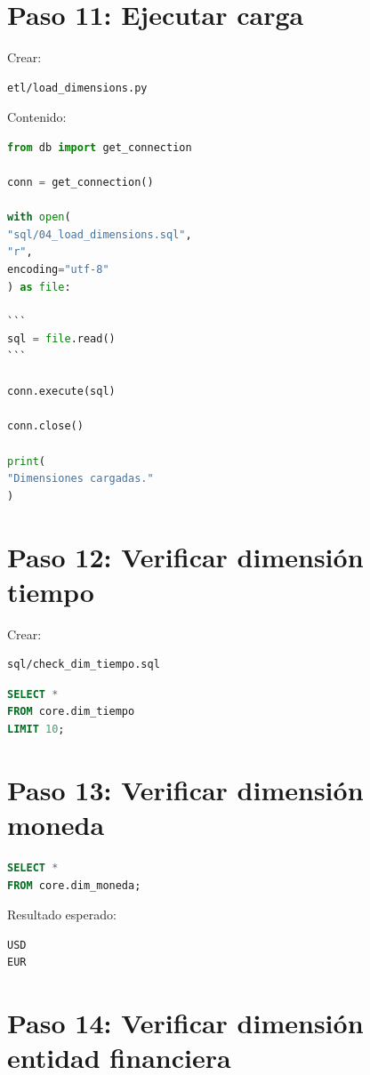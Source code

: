\section{Paso 11: Ejecutar carga}

Crear:

\begin{verbatim}
etl/load_dimensions.py
\end{verbatim}

Contenido:

\begin{lstlisting}[language=Python]
from db import get_connection

conn = get_connection()

with open(
"sql/04_load_dimensions.sql",
"r",
encoding="utf-8"
) as file:

```
sql = file.read()
```

conn.execute(sql)

conn.close()

print(
"Dimensiones cargadas."
)
\end{lstlisting}

\section{Paso 12: Verificar dimensión tiempo}

Crear:

\begin{verbatim}
sql/check_dim_tiempo.sql
\end{verbatim}

\begin{lstlisting}[language=SQL]
SELECT *
FROM core.dim_tiempo
LIMIT 10;
\end{lstlisting}

\section{Paso 13: Verificar dimensión moneda}

\begin{lstlisting}[language=SQL]
SELECT *
FROM core.dim_moneda;
\end{lstlisting}

Resultado esperado:

\begin{verbatim}
USD
EUR
\end{verbatim}

\section{Paso 14: Verificar dimensión entidad financiera}

